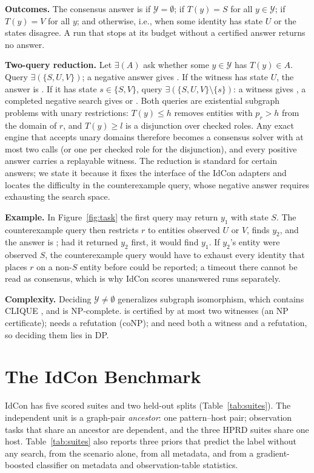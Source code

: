 \textbf{Outcomes.} The consensus answer is \Emp{} if $\mathcal{Y}=\emptyset$; \Sat{} if $T(y)=S$ for all $y\in\mathcal{Y}$; \Vio{} if $T(y)=V$ for all $y$; and \Unk{} otherwise, i.e., when some identity has state $U$ or the states disagree. A run that stops at its budget without a certified answer returns no answer.

\textbf{Two-query reduction.} Let $\exists(A)$ ask whether some $y\in\mathcal{Y}$ has $T(y)\in A$. Query $\exists(\{S,U,V\})$; a negative answer gives \Emp{}. If the witness has state $U$, the answer is \Unk{}. If it has state $s\in\{S,V\}$, query $\exists(\{S,U,V\}\setminus\{s\})$: a witness gives \Unk{}, a completed negative search gives \Sat{} or \Vio{}. Both queries are existential subgraph problems with unary restrictions: $T(y)\le h$ removes entities with $p_r>h$ from the domain of $r$, and $T(y)\ge l$ is a disjunction over checked roles. Any exact engine that accepts unary domains therefore becomes a consensus solver with at most two calls (or one per checked role for the disjunction), and every positive answer carries a replayable witness. The reduction is standard for certain answers; we state it because it fixes the interface of the IdCon adapters and locates the difficulty in the counterexample query, whose negative answer requires exhausting the search space.

\textbf{Example.} In Figure~\ref{fig:task} the first query may return $y_1$ with state $S$. The counterexample query then restricts $r$ to entities observed $U$ or $V$, finds $y_2$, and the answer is \Unk{}; had it returned $y_2$ first, it would find $y_1$. If $y_2$'s entity were observed $S$, the counterexample query would have to exhaust every identity that places $r$ on a non-$S$ entity before \Sat{} could be reported; a timeout there cannot be read as consensus, which is why IdCon scores unanswered runs separately.

\textbf{Complexity.} Deciding $\mathcal{Y}\neq\emptyset$ generalizes subgraph isomorphism, which contains CLIQUE \cite{karp}, and is NP-complete. \Unk{} is certified by at most two witnesses (an NP certificate); \Emp{} needs a refutation (coNP); \Sat{} and \Vio{} need both a witness and a refutation, so deciding them lies in DP.

\section{The IdCon Benchmark}
\label{sec:bench}
IdCon has five scored suites and two held-out splits (Table~\ref{tab:suites}). The independent unit is a graph-pair \emph{ancestor}: one pattern--host pair; observation tasks that share an ancestor are dependent, and the three HPRD suites share one host. Table~\ref{tab:suites} also reports three priors that predict the label without any search, from the scenario alone, from all metadata, and from a gradient-boosted classifier on metadata and observation-table statistics.

